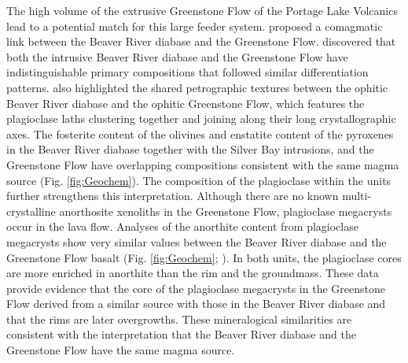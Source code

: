 The high volume of the extrusive Greenstone Flow of the Portage Lake Volcanics lead to a potential match for this large feeder system. \cite{Doyle2016a} proposed a comagmatic link between the Beaver River diabase and the Greenstone Flow. \cite{Doyle2016a} discovered that both the intrusive Beaver River diabase and the Greenstone Flow have indistinguishable primary compositions that followed similar differentiation patterns. \cite{Doyle2016a} also highlighted the shared petrographic textures between the ophitic Beaver River diabase and the ophitic Greenstone Flow, which features the plagioclase laths clustering together and joining along their long crystallographic axes. The fosterite content of the olivines and enstatite content of the pyroxenes in the Beaver River diabase together with the Silver Bay intrusions, and the Greenstone Flow have overlapping compositions consistent with the same magma source (Fig. \ref{fig:Geochem}). The composition of the plagioclase within the units further strengthens this interpretation. Although there are no known multi-crystalline anorthosite xenoliths in the Greenstone Flow, plagioclase megacrysts occur in the lava flow. Analyses of the anorthite content from plagioclase megacrysts show very similar values between the Beaver River diabase and the Greenstone Flow basalt (Fig. \ref{fig:Geochem}; \cite{Doyle2016a}). In both units, the plagioclase cores are more enriched in anorthite than the rim and the groundmass. These data provide evidence that the core of the plagioclase megacrysts in the Greenstone Flow derived from a similar source with those in the Beaver River diabase and that the rims are later overgrowths. These mineralogical similarities are consistent with the interpretation that the Beaver River diabase and the Greenstone Flow have the same magma source. 


